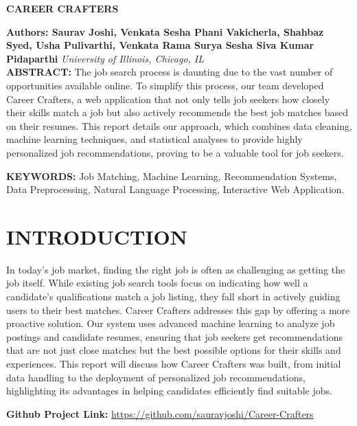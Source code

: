 \documentclass[a4paper,10pt]{article}
\begin{document}
\noindent 
\begin{center}
\textbf{{\Large CAREER CRAFTERS}} \\
\end{center}

\noindent 
\textbf{Authors: Saurav Joshi, Venkata Sesha Phani Vakicherla, Shahbaz Syed, Usha Pulivarthi, Venkata Rama Surya Sesha Siva Kumar Pidaparthi} \textit{University of Illinois, Chicago, IL}
\\

\noindent 
\textbf{ABSTRACT: } The job search process is daunting due to the vast number of opportunities available online. To simplify this process, our team developed Career Crafters, a web application that not only tells job seekers how closely their skills match a job but also actively recommends the best job matches based on their resumes. This report details our approach, which combines data cleaning, machine learning techniques, and statistical analyses to provide highly personalized job recommendations, proving to be a valuable tool for job seekers.

\noindent 
\textbf{KEYWORDS:} Job Matching, Machine Learning, Recommendation Systems, Data Preprocessing, Natural Language Processing, Interactive Web Application.

\section{INTRODUCTION}

In today’s job market, finding the right job is often as challenging as getting the job itself. While existing job search tools focus on indicating how well a candidate's qualifications match a job listing, they fall short in actively guiding users to their best matches. Career Crafters addresses this gap by offering a more proactive solution. Our system uses advanced machine learning to analyze job postings and candidate resumes, ensuring that job seekers get recommendations that are not just close matches but the best possible options for their skills and experiences. This report will discuss how Career Crafters was built, from initial data handling to the deployment of personalized job recommendations, highlighting its advantages in helping candidates efficiently find suitable jobs.

\textbf{Github Project Link: } \hyperlink{https://github.com/sauravjoshi/Career-Crafters}{https://github.com/sauravjoshi/Career-Crafters}

\end{document}
